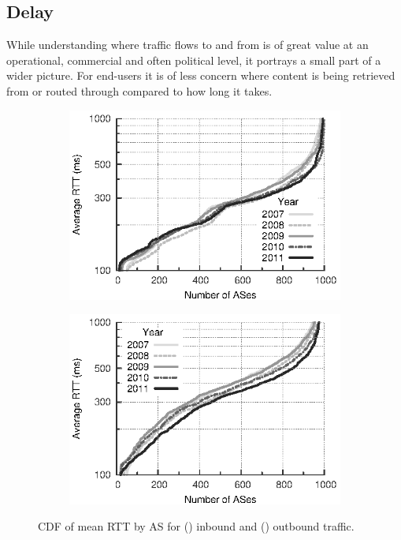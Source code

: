 \subsection{Delay}
\label{section:malawi:delay}
 
While understanding where traffic flows to and from is of great value at an operational, commercial and often political level, it portrays a small part of a wider picture. 
For end-users it is of less concern where content is being retrieved from or routed through compared to how long it takes.

\begin{figure}
    \centering
    \begin{subfigure}[b]{0.5\linewidth}
        \centering
        \includegraphics{figures/malawi/rtt_cdf_in}
        \caption{\label{fig:rtt_cdf_in}}
    \end{subfigure}%
    \begin{subfigure}[b]{0.5\linewidth}
        \centering
        \includegraphics{figures/malawi/rtt_cdf_out}
        \caption{\label{fig:rtt_cdf_out}}
    \end{subfigure}%
    \caption[\acs{CDF} of mean \acs{RTT} by \acs{AS}.]{\acs{CDF} of mean \acs{RTT} by \acs{AS} for () inbound and () outbound traffic. \label{fig:rtt_cdf}}
\end{figure}

